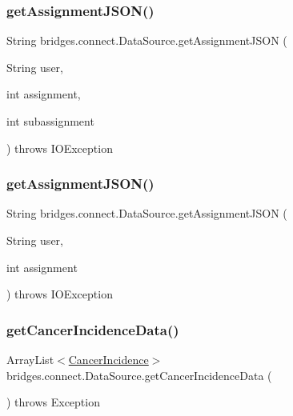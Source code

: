 \subsubsection{\texorpdfstring{get\+Assignment\+J\+S\+O\+N()}{getAssignmentJSON()}\hspace{0.1cm}{\footnotesize\ttfamily [1/2]}}
{\footnotesize\ttfamily String bridges.\+connect.\+Data\+Source.\+get\+Assignment\+J\+S\+ON (\begin{DoxyParamCaption}\item[{String}]{user,  }\item[{int}]{assignment,  }\item[{int}]{subassignment }\end{DoxyParamCaption}) throws I\+O\+Exception}

\mbox{\label{classbridges_1_1connect_1_1_data_source_af55c85da71b588f64ff4b46dbacab7f4}} 
\subsubsection{\texorpdfstring{get\+Assignment\+J\+S\+O\+N()}{getAssignmentJSON()}\hspace{0.1cm}{\footnotesize\ttfamily [2/2]}}
{\footnotesize\ttfamily String bridges.\+connect.\+Data\+Source.\+get\+Assignment\+J\+S\+ON (\begin{DoxyParamCaption}\item[{String}]{user,  }\item[{int}]{assignment }\end{DoxyParamCaption}) throws I\+O\+Exception}

\mbox{\label{classbridges_1_1connect_1_1_data_source_a320ce56eeb655c54c0fbed455e0d9f5e}} 
\subsubsection{\texorpdfstring{get\+Cancer\+Incidence\+Data()}{getCancerIncidenceData()}}
{\footnotesize\ttfamily Array\+List$<$\hyperlink{classbridges_1_1data__src__dependent_1_1_cancer_incidence}{Cancer\+Incidence}$>$ bridges.\+connect.\+Data\+Source.\+get\+Cancer\+Incidence\+Data (\begin{DoxyParamCaption}{ }\end{DoxyParamCaption}) throws Exception}

